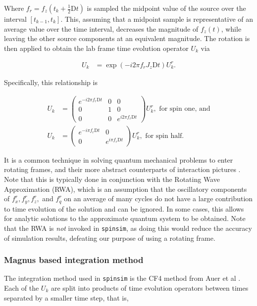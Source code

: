 \documentclass{jors}
\begin{document}
			Where \(f_r = f_z(t_k + \frac12\mathrm{D}t)\) is sampled the midpoint value of the source over the interval \([t_{k - 1}, t_k]\). This, assuming that a midpoint sample is representative of an average value over the time interval, decreases the magnitude of \(f_z(t)\), while leaving the other source components at an equivalent magnitude. The rotation is then applied to obtain the lab frame time evolution operator \(U_k\) via
			
			\begin{align}
				U_k &= \exp(-i 2 \pi f_r J_z \mathrm{D}t) U^r_k.
			\end{align}

			Specifically, this relationship is

			\begin{align}
				U_k &= \begin{pmatrix}
					e^{-i 2\pi f_r \mathrm{D}t} & 0 & 0\\
					0 & 1 & 0\\
					0 & 0 & e^{i 2\pi f_r \mathrm{D}t}
				\end{pmatrix} U^r_k, \textrm{ for spin one, and}\\
				U_k &= \begin{pmatrix}
					e^{-i \pi f_r \mathrm{D}t} & 0\\
					0 & e^{i \pi f_r \mathrm{D}t}
				\end{pmatrix} U^r_k, \textrm{ for spin half.}
			\end{align}

			It is a common technique in solving quantum mechanical problems to enter rotating frames, and their more abstract counterparts of interaction pictures \cite{j_j_sakurai_jun_john_modern_1994}. Note that this is typically done in conjunction with the Rotating Wave Approximation (RWA), which is an assumption that the oscillatory components of \(f^r_x, f^r_y, f^r_z,\) and \(f^r_q\) on an average of many cycles do not have a large contribution to time evolution of the solution and can be ignored. In some cases, this allows for analytic solutions to the approximate quantum system to be obtained. Note that the RWA is \emph{not} invoked in \texttt{spinsim}, as doing this would reduce the accuracy of simulation results, defeating our purpose of using a rotating frame.
			
		\subsubsection*{Magnus based integration method}
			The integration method used in \texttt{spinsim} is the CF4 method from Auer et al \cite{auer_magnus_2018}. Each of the \(U_k\) are split into products of time evolution operators between times separated by a smaller time step, that is,
			
\end{document}
